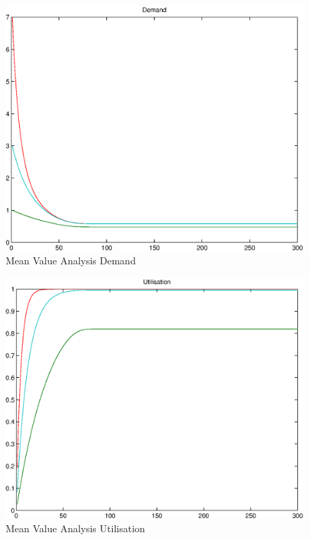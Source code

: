 \documentclass[a4paper]{article}
\begin{document}




\begin{figure}[H]
	\begin{center}
    \includegraphics[scale=0.6]{../plots-ms2-mg/mva-demand.eps}
  \end{center}
  \caption{Mean Value Analysis Demand}
  \label{fig:mva-demand}
\end{figure}




\begin{figure}[H]
	\begin{center}
    \includegraphics[scale=0.6]{../plots-ms2-mg/mva-utilisation.eps}
  \end{center}
  \caption{Mean Value Analysis Utilisation}
  \label{fig:mva-utilisation}
\end{figure}
\end{document}
